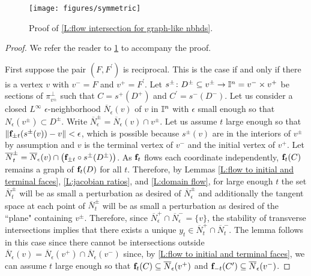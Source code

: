 \begin{figure}[!h]
	\texttt{[image: figures/symmetric]}
	\caption{Proof of \cref{L:flow intersection for graph-like nbhds}.}
	\label{F:intersection}
\end{figure}

\begin{proof}
	We refer the reader to \cref{F:intersection} to accompany the proof.

	First suppose the pair $(F,F^\prime)$ is reciprocal.
	This is the case if and only if there is a vertex $v$ with $v^- = F$ and $v^+ = F^\prime$.
	Let $s^\pm \colon D^\pm \subseteq v^\pm \to \mathbb{I}^n = v^- \times v^+$ be sections of $\pi_{v^\pm}^\perp$ such that $C = s^+(D^+)$ and $C^\prime = s^-(D^-)$.
	Let us consider a closed $L^\infty$ $\epsilon$-neighborhood $\overline N_\epsilon(v)$ of $v$ in $\mathbb{I}^n$ with $\epsilon$ small enough so that $N_\epsilon(v^\pm) \subset D^\pm$.
	Write $\overline N_\epsilon^\pm = \overline N_\epsilon(v) \cap v^\pm$.
	Let us assume $t$ large enough so that $\Vert{\mathbf{f}_{\pm t}(s^\pm(v)) - v}\Vert < \epsilon$, which is possible because $s^\pm(v)$ are in the interiors of $v^\pm$ by assumption and $v$ is the terminal vertex of $v^-$ and the initial vertex of $v^+$.
	Let $\overline N_t^\pm = \overline N_\epsilon(v) \cap \big(\mathbf{f}_{\pm t}\circ s^\pm (D^\pm)\big)$.
	As $\mathbf{f}_t$ flows each coordinate independently, $\mathbf{f}_t(C)$ remains a graph of $\mathbf{f}_t(D)$ for all $t$.
	Therefore, by Lemmas \ref{L:flow to initial and terminal faces}, \ref{L:jacobian ratios}, and \ref{L:domain flow}, for large enough $t$ the set $\overline N_t^\pm$ will be as small a perturbation as desired of $\overline N_\epsilon^\pm$ and additionally the tangent space at each point of $\overline N_t^\pm$ will be as small a perturbation as desired of the ``plane" containing $v^\pm$.
	Therefore, since $\overline N_\epsilon^+ \cap \overline N_\epsilon^- = \{v\}$, the stability of transverse intersections implies that there exists a unique $y_t \in \overline N_t^+ \cap \overline N_t^-$.
	The lemma follows in this case since there cannot be intersections outside $\overline N_\epsilon(v) = \overline N_\epsilon(v^+) \cap \overline N_\epsilon(v^-)$ since, by \cref{L:flow to initial and terminal faces}, we can assume $t$ large enough so that $\mathbf{f}_t(C) \subseteq \overline N_\epsilon(v^+)$ and $\mathbf{f}_{-t}(C^\prime) \subseteq \overline N_\epsilon(v^-)$.


\end{proof}
